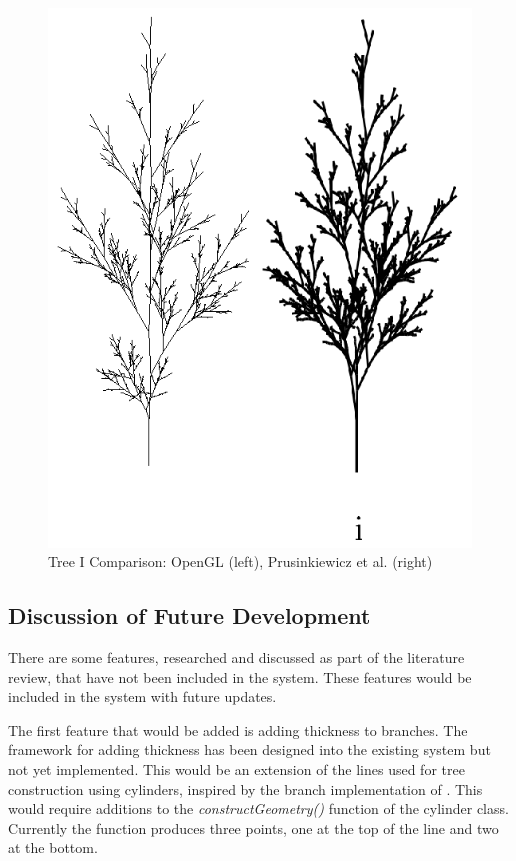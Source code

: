 \documentclass[final]{cmpreport}
\begin{document}
\begin{figure}[ht]
    \includegraphics[scale=0.4]{tree-comp-i.png} 
    \centering
    \captionsetup{justification=centering}
    \caption{Tree I Comparison: OpenGL (left), Prusinkiewicz et al. (right)}
    \label{fig:tree-comp-i}
\end{figure}

\subsection{Discussion of Future Development}
There are some features, researched and discussed as part of the literature review, that have not 
been included in the system. These features would be included in the system with future updates.

The first feature that would be added is adding thickness to branches. The framework for 
adding thickness has been designed into the existing system but not yet implemented. This would 
be an extension of the lines used for tree construction using cylinders, inspired by the branch 
implementation of \cite{weber1995rendering}. This would require additions to the 
\emph{constructGeometry()} function of the cylinder class. Currently the function produces 
three points, one at the top of the line and two at the bottom. 
\end{document}
